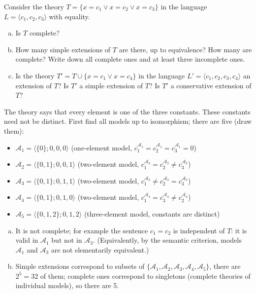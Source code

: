 \begin{problem}

    Consider the theory $T=\{x=c_1 \vee x=c_2 \vee x=c_3\}$ in the language $L=\langle c_1,c_2,c_3\rangle$ with equality.
    \begin{enumerate}[(a)]     
        \item Is $T$ complete?
        \item How many simple extensions of $T$ are there, up to equivalence? How many are complete? Write down all complete ones and at least three incomplete ones.
        \item Is the theory $T'=T\cup\{x=c_1 \vee x=c_4\}$ in the language $L'=\langle c_1,c_2,c_3,c_4\rangle$ an extension of $T$? Is $T'$ a simple extension of $T$? Is $T'$ a conservative extension of $T$?
    \end{enumerate}

    \begin{solution}
        
        The theory says that every element is one of the three constants. These constants need not be distinct. First find all models up to isomorphism; there are five (draw them):
        \begin{itemize}
            \item $\mathcal A_1=\langle\{0\};0,0,0\rangle$ (one-element model, $c_1^{\mathcal A_1}=c_2^{\mathcal A_1}=c_3^{\mathcal A_1}=0$)
            \item $\mathcal A_2=\langle\{0,1\};0,0,1\rangle$ (two-element model, $c_1^{\mathcal A_2}=c_2^{\mathcal A_2}\neq c_3^{\mathcal A_2}$)
            \item $\mathcal A_3=\langle\{0,1\};0,1,1\rangle$ (two-element model, $c_1^{\mathcal A_3}\neq c_2^{\mathcal A_3}=c_3^{\mathcal A_3}$) 
            \item $\mathcal A_4=\langle\{0,1\};0,1,0\rangle$ (two-element model, $c_1^{\mathcal A_4}=c_3^{\mathcal A_4}\neq c_2^{\mathcal A_4}$)
            \item $\mathcal A_5=\langle\{0,1,2\};0,1,2\rangle$ (three-element model, constants are distinct)
        \end{itemize}
        \begin{enumerate}[(a)]
            \item It is not complete; for example the sentence $c_1=c_2$ is independent of $T$: it is valid in $\mathcal A_1$ but not in $\mathcal A_3$. (Equivalently, by the semantic criterion, models $\mathcal A_1$ and $\mathcal A_3$ are not elementarily equivalent.)
            \item Simple extensions correspond to subsets of $\{\mathcal A_1,\mathcal A_2,\mathcal A_3,\mathcal A_4,\mathcal A_5\}$, there are $2^5=32$ of them; complete ones correspond to singletons (complete theories of individual models), so there are 5.
            

\end{enumerate}
\end{solution}
\end{problem}
